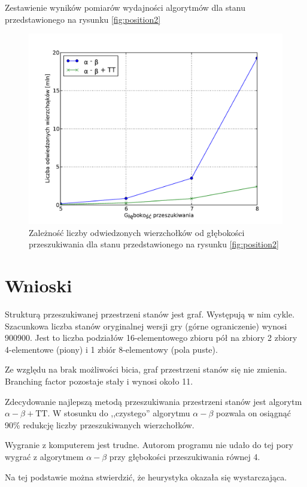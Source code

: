 \documentclass{scrartcl}
\begin{document}
\begin{table}[h]
  \centering
  \caption{Zestawienie wyników  pomiarów wydajności algorytmów dla stanu
    przedstawionego na rysunku \ref{fig:position2}}
  \label{table:position2}
  
\end{table}

\begin{figure}[h]
  \centering
  \includegraphics[scale=0.5]{data/results2.pdf}
  \caption{Zależność liczby odwiedzonych wierzchołków od głębokości
    przeszukiwania dla stanu przedstawionego na rysunku
    \ref{fig:position2}}
  \label{fig:results2}
\end{figure}

\newpage
\clearpage

\section{Wnioski}

Strukturą przeszukiwanej przestrzeni stanów jest graf. Występują w
nim cykle. Szacunkowa liczba stanów oryginalnej wersji gry
(górne ograniczenie) wynosi 900900. Jest to liczba podziałów 
16-elementowego zbioru pół na zbiory 2 zbiory 4-elementowe (piony) i
1 zbiór 8-elementowy (pola puste).

Ze względu na brak możliwości bicia, graf przestrzeni stanów się 
nie zmienia. Branching factor pozostaje stały i wynosi około 11.

Zdecydowanie najlepszą metodą przeszukiwania przestrzeni stanów 
jest algorytm $\alpha - \beta + \text{TT}$. W stosunku do 
,,czystego'' algorytmu $\alpha - \beta$ pozwala on osiągnąć 
90\% redukcję liczby przeszukiwanych wierzchołków.

Wygranie z komputerem jest trudne. Autorom programu nie udało 
do tej pory wygrać z algorytmem $\alpha - \beta$ przy głębokości
przeszukiwania równej 4.

Na tej podstawie można stwierdzić, że heurystyka okazała się
wystarczająca.
\end{document}
